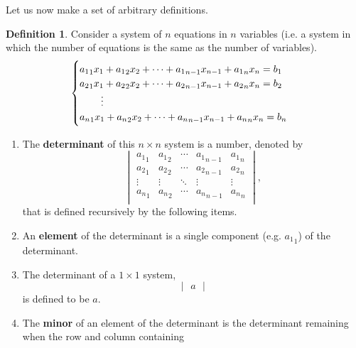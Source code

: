 \documentclass[a4paper,leqno]{article}
\numberwithin{equation}{section}
\theoremstyle{definition}
\newtheorem{defn}[equation]{Definition}
\theoremstyle{remark}
\newcommand{\df}[1]{\textbf{#1}}
\begin{document}
Let us now make a set of arbitrary definitions.
\begin{defn}
  Consider a system of $ n $ equations in $ n $ variables (i.e. a system in which the number of equations is the same as the number of variables).
  \begin{equation}
    \begin{cases}
      {a_1}_1 x_1 + {a_1}_2 x_2 + \cdots + {a_1}_{n - 1} x_{n - 1} + {a_1}_n x_n = b_1\\
      {a_2}_1 x_1 + {a_2}_2 x_2 + \cdots + {a_2}_{n - 1} x_{n - 1} + {a_2}_n x_n = b_2\\
        \hspace{0.15em}\qquad\vdots\\
      {a_n}_1 x_1 + {a_n}_2 x_2 + \cdots + {a_n}_{n - 1} x_{n - 1} + {a_n}_n x_n = b_n
    \end{cases}
  \end{equation}
  \begin{enumerate}
    \item The \df{determinant} of this $ n \times n $ system is a number, denoted by
          \begin{equation}
            \begin{vmatrix}
              {a_1}_1 & {a_1}_2 & \cdots & {a_1}_{n - 1} & {a_1}_n\\
              {a_2}_1 & {a_2}_2 & \cdots & {a_2}_{n - 1} & {a_2}_n\\
                \vdots & \vdots & \ddots & \vdots & \vdots \\
              {a_n}_1 & {a_n}_2 & \cdots & {a_n}_{n - 1} & {a_n}_n\\
            \end{vmatrix},
          \end{equation}
          that is defined recursively by the following items.
    \item An \df{element} of the determinant is a single component (e.g. $ {a_1}_1 $) of the determinant.
    \item The determinant of a $ 1 \times 1 $ system,
          \begin{equation}
            \begin{vmatrix}
              a
            \end{vmatrix}
          \end{equation}
          is defined to be $ a $.
    \item The \df{minor} of an element of the determinant is the determinant remaining when the row and column containing

\end{enumerate}
\end{defn}
\end{document}

